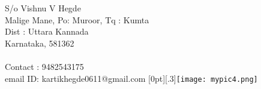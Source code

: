 \documentclass{resume} %
\begin{document}
\begin{rSection}{}

 S/o Vishnu V Hegde 
 \\Malige Mane, Po: Muroor, Tq : Kumta  
 \\Dist : Uttara Kannada 
 \\Karnataka, 581362\\
 \\Contact : 9482543175
 \\email ID: kartikhegde0611@gmail.com\hfill 
 \raisebox{-.1\totalheight}[0pt][.3\totalheight]{\texttt{[image: mypic4.png]}}

\end{rSection}
\end{document}

